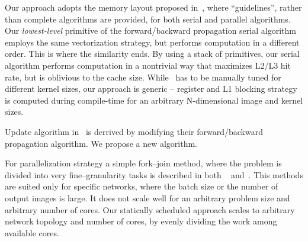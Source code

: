   Our approach adopts the memory layout proposed
  in~\cite{chellapilla2006high,das2016distributed}, where
  ``guidelines'', rather than complete algorithms are provided, for
  both serial and parallel algorithms.  Our \emph{lowest-level}
  primitive of the forward/backward propagation serial algorithm
  employs the same vectorization strategy, but performs computation in
  a different order.  This is where the similarity ends.  By using a
  stack of primitives, our serial algorithm performs computation in a
  nontrivial way that maximizes L2/L3 hit rate, but is oblivious to
  the cache size.  While~\cite{chellapilla2006high} has to be manually
  tuned for different kernel sizes, our approach is generic --
  register and L1 blocking strategy is computed during compile-time
  for an arbitrary N-dimensional image and kernel sizes.

  Update algorithm in~\cite{chellapilla2006high} is derrived by
  modifying their forward/backward propagation algorithm.  We propose
  a new algorithm.

  For parallelization strategy a simple fork--join method, where the
  problem is divided into very fine--granularity tasks is described in
  both ~\cite{chellapilla2006high} and~\cite{das2016distributed}.
  This methods are suited only for specific networks, where the batch
  size or the number of output images is large.  It does not scale
  well for an arbitrary problem size and arbitrary number of cores.
  Our statically scheduled approach scales to arbitrary network
  topology and number of cores, by evenly dividing the work among
  available cores.


